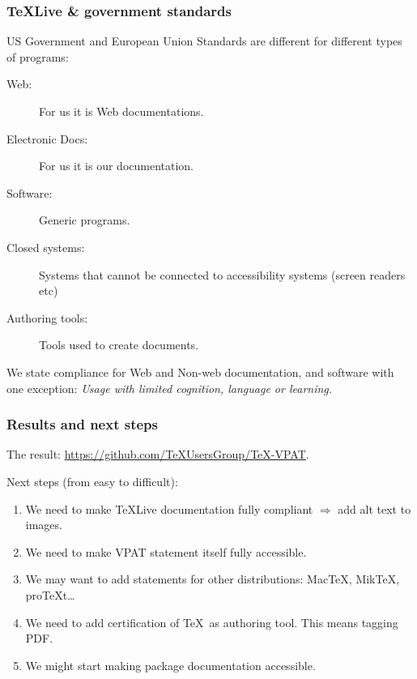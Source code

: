 \documentclass{beamer}
\begin{document}
\begin{frame}
  \frametitle{\TeX Live \& government standards}

  US Government and European Union Standards are different for
  different types of programs:
  \begin{description}
  \item[Web:]  For us it is Web documentations.
  \item[Electronic Docs:] For us it is our documentation.
  \item[Software:] Generic programs.
  \item[Closed systems:] Systems that cannot be connected to
    accessibility systems (screen readers etc)
  \item[Authoring tools:] Tools used to create documents.  
  \end{description}

  We state compliance for Web and Non-web documentation, and software
  with one exception: \emph{Usage with limited cognition, language or
    learning.}  
  
\end{frame}

\begin{frame}
  \frametitle{Results and next steps}
  The result:  \url{https://github.com/TeXUsersGroup/TeX-VPAT}.

  Next steps (from easy to difficult):
  \begin{enumerate}
  \item We need to make \TeX Live documentation fully compliant
    $\Rightarrow$ add alt text to images.
  \item We need to make VPAT statement itself fully accessible.
  \item We may want to add statements for other distributions:
    Mac\TeX, Mik\TeX, pro\TeX t\ldots
  \item We need to add certification of \TeX\ as authoring tool.  This
    means tagging PDF.
  \item We might start making package documentation accessible.  
  \end{enumerate}

\end{frame}
\end{document}
